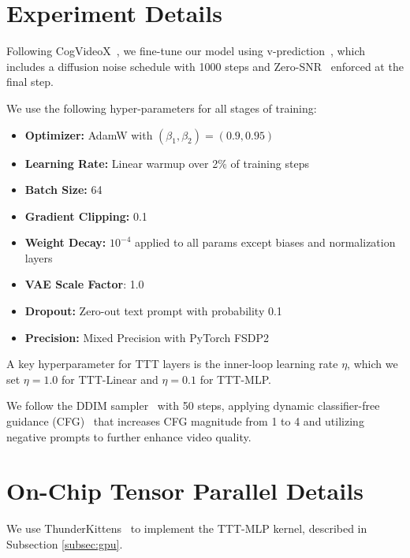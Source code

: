 \section{Experiment Details}
\label{sec:appendix:implementation}

Following CogVideoX~\cite{yang2024cogvideox}, we fine-tune our model using v-prediction~\cite{salimans2022progressive}, which includes a diffusion noise schedule with 1000 steps and Zero-SNR~\cite{lin2024zerosnr} enforced at the final step.

 We use the following hyper-parameters for all stages of training:

\vspace{0.2em}
\begin{itemize}[itemsep=0.2em]
    \item \textbf{Optimizer:} AdamW with $(\beta_1, \beta_2) = (0.9, 0.95)$
    \item \textbf{Learning Rate:} Linear warmup over 2\% of training steps
    \item \textbf{Batch Size:} 64
    \item \textbf{Gradient Clipping:} 0.1
    \item \textbf{Weight Decay:} $10^{-4}$ applied to all params except biases and normalization layers
    \item \textbf{VAE Scale Factor}: 1.0
    \item \textbf{Dropout:} Zero-out text prompt with probability 0.1
    \item \textbf{Precision:} Mixed Precision with PyTorch FSDP2
\end{itemize}

 A key hyperparameter for TTT layers is the inner-loop learning rate $\eta$, which we set $\eta = 1.0$ for TTT-Linear and $\eta = 0.1$ for TTT-MLP.

 We follow the DDIM sampler~\cite{song2021ddim} with 50 steps, applying dynamic classifier-free guidance (CFG)~\cite{ho2022cfg} that increases CFG magnitude from 1 to 4 and utilizing negative prompts to further enhance video quality.

\section{On-Chip Tensor Parallel Details}
\label{sec:appendix:systems}

We use ThunderKittens~\cite{spector2025thunderkittens} to implement the TTT-MLP kernel, described in Subsection \ref{subsec:gpu}.

